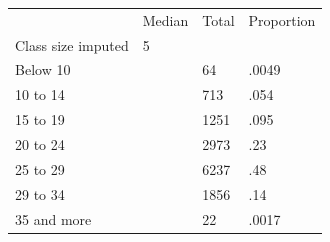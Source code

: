 \documentclass{article}
\begin{document}
\begin{table}[!h]
\centering
\begin{tabular}{llll}
\cline{1-4}
\multicolumn{1}{|l}{} &
  \multicolumn{1}{|l}{Median} &
  \multicolumn{1}{|l}{Total} &
  \multicolumn{1}{|l|}{Proportion} \\
\cline{1-4}
\multicolumn{1}{|l}{Class size imputed} &
  \multicolumn{1}{|l}{5} &
  \multicolumn{1}{|l}{} &
  \multicolumn{1}{|l|}{} \\
\cline{1-4}
\multicolumn{1}{|l}{Below 10} &
  \multicolumn{1}{|l}{} &
  \multicolumn{1}{|l}{64} &
  \multicolumn{1}{|l|}{.0049} \\
\cline{1-4}
\multicolumn{1}{|l}{10 to 14} &
  \multicolumn{1}{|l}{} &
  \multicolumn{1}{|l}{713} &
  \multicolumn{1}{|l|}{.054} \\
\cline{1-4}
\multicolumn{1}{|l}{15 to 19} &
  \multicolumn{1}{|l}{} &
  \multicolumn{1}{|l}{1251} &
  \multicolumn{1}{|l|}{.095} \\
\cline{1-4}
\multicolumn{1}{|l}{20 to 24} &
  \multicolumn{1}{|l}{} &
  \multicolumn{1}{|l}{2973} &
  \multicolumn{1}{|l|}{.23} \\
\cline{1-4}
\multicolumn{1}{|l}{25 to 29} &
  \multicolumn{1}{|l}{} &
  \multicolumn{1}{|l}{6237} &
  \multicolumn{1}{|l|}{.48} \\
\cline{1-4}
\multicolumn{1}{|l}{29 to 34} &
  \multicolumn{1}{|l}{} &
  \multicolumn{1}{|l}{1856} &
  \multicolumn{1}{|l|}{.14} \\
\cline{1-4}
\multicolumn{1}{|l}{35 and more} &
  \multicolumn{1}{|l}{} &
  \multicolumn{1}{|l}{22} &
  \multicolumn{1}{|l|}{.0017} \\
\cline{1-4}
\end{tabular}
\end{table}
\end{document}
